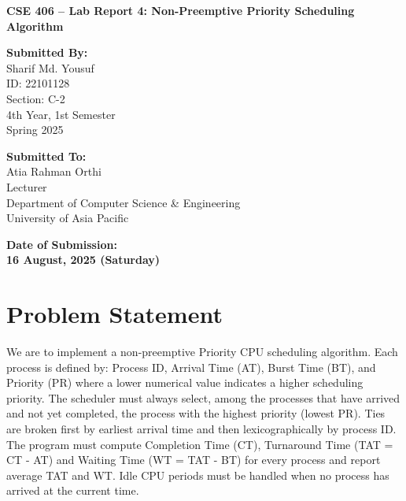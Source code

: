 \documentclass[12pt,a4paper]{article}
\begin{document}
\begin{titlepage}
  \centering
  \vspace*{3cm}

  {\Huge\bfseries CSE 406 – Lab Report 4: Non-Preemptive Priority Scheduling Algorithm \par}
  \vspace{2.5cm}

  \noindent
  \begin{minipage}[t]{0.48\textwidth}
    {\large\bfseries Submitted By:}\\[0.5em]
    \Large
    Sharif Md. Yousuf \\
    ID: 22101128 \\
    Section: C-2 \\
    4th Year, 1st Semester \\
    Spring 2025
  \end{minipage}
  \hfill
  \begin{minipage}[t]{0.48\textwidth}
    {\large\bfseries Submitted To:}\\[0.5em]
    \Large
    Atia Rahman Orthi \\
    Lecturer \\
    Department of Computer Science \& Engineering \\
    University of Asia Pacific
  \end{minipage}

  \vfill

  {\Large\bfseries Date of Submission:} \\[0.5em]
  {\LARGE\bfseries 16 August, 2025 (Saturday)}

  \vspace*{2cm}
\end{titlepage}

\section{Problem Statement}
We are to implement a non-preemptive Priority CPU scheduling algorithm. Each process is defined by: Process ID, Arrival Time (AT), Burst Time (BT), and Priority (PR) where a lower numerical value indicates a higher scheduling priority. The scheduler must always select, among the processes that have arrived and not yet completed, the process with the highest priority (lowest PR). Ties are broken first by earliest arrival time and then lexicographically by process ID. The program must compute Completion Time (CT), Turnaround Time (TAT = CT - AT) and Waiting Time (WT = TAT - BT) for every process and report average TAT and WT. Idle CPU periods must be handled when no process has arrived at the current time.
\end{document}
